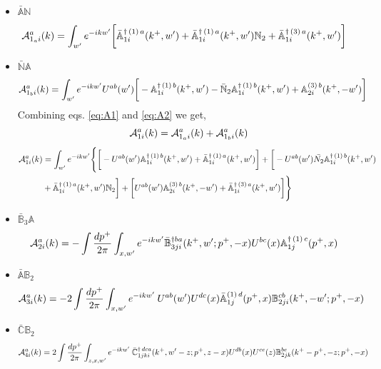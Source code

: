 \documentclass[aps,prd,amsmath,amssymb,nofootinbib]{revtex4-2}
\def\mf#1{\mathbb{#1}}
\numberwithin{equation}{section}
\begin{document}
\begin{itemize}
    \item $\bar{\mf{A}} \mf{N}$
\begin{align} \label{eq:A1}
    {\cal A}_{1_{a} i} ^{a} (k)
 & = \int_{w^{\prime}}e^{-ikw^{\prime}}\bigg[\bar{\mf{A}}^{\dagger\,(1)\,a}_{1i}(k^{+},w^{\prime})+\bar{\mf{A}}^{\dagger\,(1)\,a}_{1i}(k^{+},w^{\prime})\mf{N}_{2}+\bar{\mf{A}}^{\dagger\,(3)\,a}_{1i}(k^{+},w^{\prime})\bigg]
\end{align}
\item $\bar{\mf{N}} \mf{A}$
 \begin{align} \label{eq:A2}
    {\cal A}_{1_{b} i} ^{a} (k)
 & =  \int_{w^{\prime}}e^{-ikw^{\prime}} U^{ab}(w^{\prime})\bigg[-\mf{A}^{\dagger\, (1)\, b}_{1i}(k^{+},w^{\prime})-\bar{\mf{N}}_{2}\mf{A}^{\dagger\, (1)\, b}_{1i}(k^{+},w^{\prime})+\mf{A}^{(3)\, b}_{2i}(k^{+},-w^{\prime})\bigg]
 \end{align}
Combining eqs. \eqref{eq:A1} and \eqref{eq:A2} we get,
$$ {\cal A}^{a}_{1i}(k) = {\cal A}_{1_{a} i} ^{a} (k)+{\cal A}_{1_{b} i} ^{a} (k) $$
\begin{align}
        {\cal A}^{a}_{1i}(k) & = \int_{w^{\prime}} e^{-ikw^{\prime}}\Bigg\{\bigg[-U^{ab}(w^{\prime})\mf{A}^{\dagger\,(1)\, b}_{1i}(k^{+},w^{\prime})+\Bar{\mf{A}}^{\dagger\, (1)\, a}_{1i}(k^{+}, w^{\prime})\bigg]+\bigg[-U^{ab}(w^{\prime})\Bar{N_{2}}\mf{A}^{\dagger\,(1)\, b}_{1i} (k^{+},w^{\prime})\notag \\ & +\Bar{\mf{A}}^{\dagger\,(1)\, a}_{1i}(k^{+}, w^{\prime})\mf{N}_{2}\bigg] + \bigg[U^{ab}(w^{\prime})\mf{A}^{(3)\, b}_{2i}(k^{+},-w^{\prime})+\Bar{\mf{A}}^{\dagger\,(3)\, a}_{1i}(k^{+}, w^{\prime})\bigg]\Bigg\}
\end{align}
 \item $\bar{\mf{B}}_{3}\mf{A}$
\begin{align}
    {\cal A}_{2 i} ^{a} (k)
 & = - \int \frac{dp^{+}}{2\pi} \int_{x,w^{\prime}} e^{-ikw^{\prime}} \Bar{\mf{B}}^{\dagger ba}_{3ji}(k^{+},w^{\prime}; p^{+},-x) U^{bc}(x) \mf{A}^{\dagger\,(1)\, c}_{1j}(p^{+},x)
\end{align}
\item $\bar{{\mf{A}}} \mf{B}_{2}$
  \begin{align}
    {\cal A}_{3 i} ^{a} (k)
 & = -2 \int \frac{dp^{+}}{2\pi} \int_{x,w^{\prime}} e^{-i k w^\prime}  \:U^{ab}(w^\prime)U^{dc}(x) \bar{\mf{A}}^{(1)\, d}_{1j}(p^+,x) {\mf{B}}^{cb}_{2ji} (k^+,-w^\prime;p^+, -x) \:
\end{align}
\item $\bar{{\mf{C}}} \mf{B}_{2}$ 
     \begin{align}
        {\cal A}_{4 i} ^{a} (k) & =  2  \int 
 \frac{d p^+}{2\pi}  
 \int_{z, x, w^\prime} e^{-i k w^\prime}  \:
                \bar{\mf{C}}^{\dagger\, dca}_{1jki}(k^+,w^\prime-z; p^+, z-x)  
                 U^{db}(x)
                 U^{ce}(z) 
                {\mf{B}}^{be}_{2jk} (k^{+}-p^+, -z; p^+, -x)
    \end{align}
\end{itemize}
\end{document}
